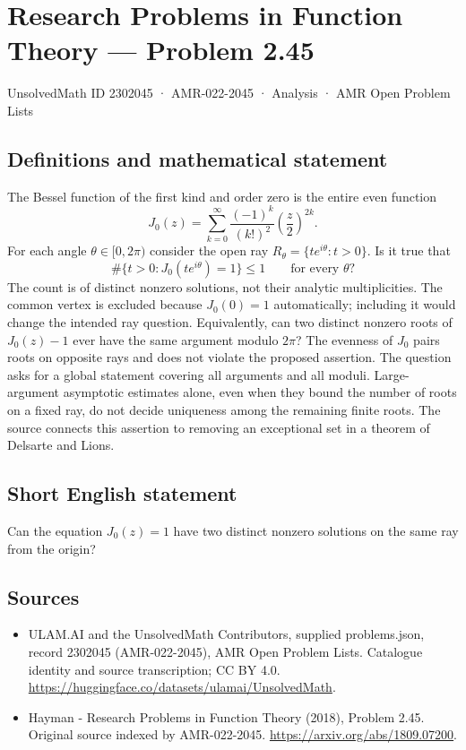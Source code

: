 \documentclass[11pt,a4paper]{article}
\begin{document}
\section*{Research Problems in Function Theory — Problem 2.45}\label{2302045}
{\small UnsolvedMath ID 2302045 · AMR-022-2045 · Analysis · AMR Open Problem Lists}
\subsection{Definitions and mathematical statement}
The Bessel function of the first kind and order zero is the entire even function
\[
J_0(z)=\sum_{k=0}^{\infty}\frac{(-1)^k}{(k!)^2}\left(\frac z2\right)^{2k}.
\]
For each angle $\theta\in[0,2\pi)$ consider the open ray
$R_\theta=\{te^{i\theta}:t>0\}$. Is it true that
\[
\#\{t>0:J_0(te^{i\theta})=1\}\le1
\qquad\text{for every }\theta?
\]
The count is of distinct nonzero solutions, not their analytic multiplicities. The common vertex is excluded because $J_0(0)=1$ automatically; including it would change the intended ray question. Equivalently, can two distinct nonzero roots of $J_0(z)-1$ ever have the same argument modulo $2\pi$? The evenness of $J_0$ pairs roots on opposite rays and does not violate the proposed assertion.
The question asks for a global statement covering all arguments and all moduli. Large-argument asymptotic estimates alone, even when they bound the number of roots on a fixed ray, do not decide uniqueness among the remaining finite roots. The source connects this assertion to removing an exceptional set in a theorem of Delsarte and Lions.
\subsection{Short English statement}
Can the equation $J_0(z)=1$ have two distinct nonzero solutions on the same ray from the origin?
\subsection{Sources}
\begin{itemize}
\item[S1] ULAM.AI and the UnsolvedMath Contributors, supplied problems.json, record 2302045 (AMR-022-2045), AMR Open Problem Lists. Catalogue identity and source transcription; CC BY 4.0.
\url{https://huggingface.co/datasets/ulamai/UnsolvedMath}.
\item[S2] Hayman - Research Problems in Function Theory (2018), Problem 2.45. Original source indexed by AMR-022-2045.
\url{https://arxiv.org/abs/1809.07200}.
\end{itemize}
\end{document}
